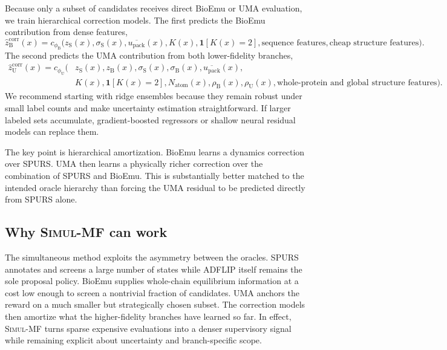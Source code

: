 \documentclass[11pt]{article}
\newcommand{\packunc}{\ensuremath{u_{\mathrm{pack}}}}
\newcommand{\methodI}{\textsc{Simul-MF}}
\begin{document}
	Because only a subset of candidates receives direct BioEmu or UMA evaluation, we train hierarchical correction models. The first predicts the BioEmu contribution from dense features,
	\begin{equation}
		\widehat z_{\mathrm B}^{\mathrm{corr}}(x)=c_{\phi_{\mathrm B}}\big(z_{\mathrm S}(x),\sigma_{\mathrm S}(x),\overline{\packunc}(x),K(x),\mathbf{1}[K(x)=2],\text{sequence features},\text{cheap structure features}\big).
	\end{equation}
	The second predicts the UMA contribution from both lower-fidelity branches,
	\begin{equation}
		\begin{aligned}
			\widehat z_{\mathrm U}^{\mathrm{corr}}(x)=c_{\phi_{\mathrm U}}\big(&z_{\mathrm S}(x),z_{\mathrm B}(x),\sigma_{\mathrm S}(x),\sigma_{\mathrm B}(x),\overline{\packunc}(x),\\
			&K(x),\mathbf{1}[K(x)=2],N_{\mathrm{atom}}(x),\rho_{\mathrm B}(x),\rho_{\mathrm U}(x),\text{whole-protein and global structure features}\big).
		\end{aligned}
	\end{equation}
	We recommend starting with ridge ensembles because they remain robust under small label counts and make uncertainty estimation straightforward. If larger labeled sets accumulate, gradient-boosted regressors or shallow neural residual models can replace them.
	
	The key point is hierarchical amortization. BioEmu learns a dynamics correction over SPURS. UMA then learns a physically richer correction over the combination of SPURS and BioEmu. This is substantially better matched to the intended oracle hierarchy than forcing the UMA residual to be predicted directly from SPURS alone.
	
	
	\subsection{Why \methodI{} can work}
	
	The simultaneous method exploits the asymmetry between the oracles. SPURS annotates and screens a large number of states while ADFLIP itself remains the sole proposal policy. BioEmu supplies whole-chain equilibrium information at a cost low enough to screen a nontrivial fraction of candidates. UMA anchors the reward on a much smaller but strategically chosen subset. The correction models then amortize what the higher-fidelity branches have learned so far. In effect, \methodI{} turns sparse expensive evaluations into a denser supervisory signal while remaining explicit about uncertainty and branch-specific scope.
	
\end{document}
